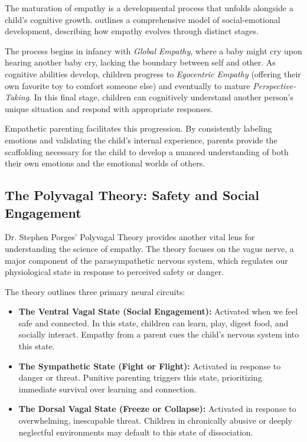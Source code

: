 The maturation of empathy is a developmental process that unfolds alongside a child's cognitive growth. 
\citet{hoffman2000} outlines a comprehensive model of social-emotional development, describing how empathy evolves through distinct stages.

The process begins in infancy with \textit{Global Empathy}, where a baby might cry upon hearing another baby cry, lacking the boundary between self and other.
As cognitive abilities develop, children progress to \textit{Egocentric Empathy} (offering their own favorite toy to comfort someone else) and eventually to mature \textit{Perspective-Taking}. 
In this final stage, children can cognitively understand another person's unique situation and respond with appropriate responses.

Empathetic parenting facilitates this progression. 
By consistently labeling emotions and validating the child's internal experience, parents provide the scaffolding necessary for the child to develop a nuanced understanding of both their own emotions and the emotional worlds of others.

\subsection{The Polyvagal Theory: Safety and Social Engagement}

Dr. Stephen Porges' Polyvagal Theory provides another vital lens for understanding the science of empathy. 
The theory focuses on the vagus nerve, a major component of the parasympathetic nervous system, which regulates our physiological state in response to perceived safety or danger.

The theory outlines three primary neural circuits:
\begin{itemize}
    \item \textbf{The Ventral Vagal State (Social Engagement):} Activated when we feel safe and connected.
    In this state, children can learn, play, digest food, and socially interact. 
    Empathy from a parent cues the child's nervous system into this state.
    \item \textbf{The Sympathetic State (Fight or Flight):} Activated in response to danger or threat.
    Punitive parenting triggers this state, prioritizing immediate survival over learning and connection.
    \item \textbf{The Dorsal Vagal State (Freeze or Collapse):} Activated in response to overwhelming, inescapable threat. 
    Children in chronically abusive or deeply neglectful environments may default to this state of dissociation.
\end{itemize}


